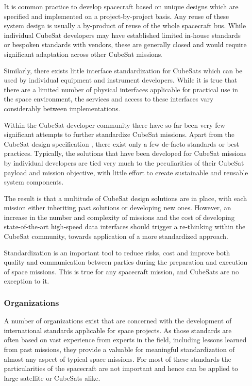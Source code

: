 It is common practice to develop spacecraft based on unique designs which are specified and implemented on a project-by-project basis. Any reuse of these system design is usually a by-product of reuse of the whole spacecraft bus. While individual CubeSat developers may have established limited in-house standards or bespoken standards with vendors, these are generally closed and would require significant adaptation across other CubeSat missions.

Similarly, there exists little interface standardization for CubeSats which can be used by individual equipment and instrument developers. While it is true that there are a limited number of physical interfaces applicable for practical use in the space environment, the services and access to these interfaces vary considerably between implementations.

Within the CubeSat developer community there have so far been very few significant attempts to further standardize CubeSat missions. Apart from the CubeSat design specification \cite{cubesat_design_specification}, there exist only a few de-facto standards or best practices. Typically, the solutions that have been developed for CubeSat missions by individual developers are tied very much to the peculiarities of their CubeSat payload and mission objective, with little effort to create sustainable and reusable system components.

The result is that a multitude of CubeSat design solutions are in place, with each mission either inheriting past solutions or developing new ones. However, an increase in the number and complexity of missions and the cost of developing state-of-the-art high-speed data interfaces should trigger a re-thinking within the CubeSat community, towards application of a more standardized approach.

Standardization is an important tool to reduce risks, cost and improve both quality and communication between parties during the preparation and execution of space missions. This is true for any spacecraft mission, and CubeSats are no exception to it.

\subsubsection{Organizations}

A number of organizations exist that are concerned with the development of international standards applicable for space projects. As those standards are often based on vast experience from experts in the field, including lessons learned from past missions, they provide a valuable for meaningful standardization of almost any aspect of typical space missions. For most of these standards the particularities of the spacecraft are not important and hence can be applied to large satellite or CubeSats alike.

